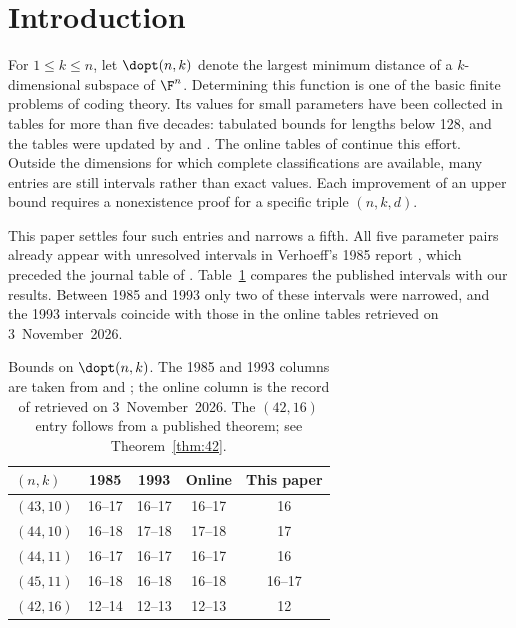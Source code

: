 \section{Introduction}
For $1\le k\le n$, let $\dopt(n,k)$ denote the largest minimum distance of a $k$-dimensional subspace of $\F^n$. Determining this function is one of the basic finite problems of coding theory. Its values for small parameters have been collected in tables for more than five decades: \citet{helgert1973} tabulated bounds for lengths below 128, and the tables were updated by \citet{verhoeff1987} and \citet{brouwer1993}. The online tables of \citet{grasslTables} continue this effort. Outside the dimensions for which complete classifications are available, many entries are still intervals rather than exact values. Each improvement of an upper bound requires a nonexistence proof for a specific triple $(n,k,d)$.

This paper settles four such entries and narrows a fifth. All five parameter pairs already appear with unresolved intervals in Verhoeff's 1985 report \citep{verhoeff1985}, which preceded the journal table of \citet{verhoeff1987}. Table~\ref{tab:history} compares the published intervals with our results. Between 1985 and 1993 only two of these intervals were narrowed, and the 1993 intervals coincide with those in the online tables retrieved on 3~November~2026.

\begin{table}[t]
\caption{Bounds on $\dopt(n,k)$. The 1985 and 1993 columns are taken from \citet[Appendix~I]{verhoeff1985} and \citet[Table~I]{brouwer1993}; the online column is the record of \citet{grasslTables} retrieved on 3~November~2026. The $(42,16)$ entry follows from a published theorem; see Theorem~\ref{thm:42}.}
\label{tab:history}
\centering\small
\begin{tabular}{@{}lcccc@{}}
\toprule
$(n,k)$ & 1985 & 1993 & Online & This paper\\
\midrule
$(43,10)$ & 16--17 & 16--17 & 16--17 & 16\\
$(44,10)$ & 16--18 & 17--18 & 17--18 & 17\\
$(44,11)$ & 16--17 & 16--17 & 16--17 & 16\\
$(45,11)$ & 16--18 & 16--18 & 16--18 & 16--17\\
$(42,16)$ & 12--14 & 12--13 & 12--13 & 12\\
\bottomrule
\end{tabular}
\end{table}

